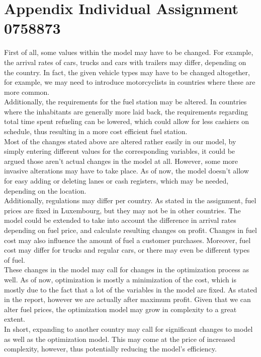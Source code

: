\section{Appendix Individual Assignment 0758873}\label{app:indivramon}
First of all, some values within the model may have to be changed.
For example, the arrival rates of cars, trucks and cars with trailers may differ, depending on the country.
In fact, the given vehicle types may have to be changed altogether, for example, we may need to introduce motorcyclists in countries where these are more common. \\
Additionally, the requirements for the fuel station may be altered.
In countries where the inhabitants are generally more laid back, the requirements regarding total time spent refueling can be lowered, which could allow for less cashiers on schedule, thus resulting in a more cost efficient fuel station. \\

Most of the changes stated above are altered rather easily in our model, by simply entering different values for the corresponding variables, it could be argued those aren't actual changes in the model at all.
However, some more invasive alterations may have to take place.
As of now, the model doesn't allow for easy adding or deleting lanes or cash registers, which may be needed, depending on the location. \\
Additionally, regulations may differ per country.
As stated in the assignment, fuel prices are fixed in Luxembourg, but they may not be in other countries.
The model could be extended to take into account the difference in arrival rates depending on fuel price, and calculate resulting changes on profit.
Changes in fuel cost may also influence the amount of fuel a customer purchases.
Moreover, fuel cost may differ for trucks and regular cars, or there may even be different types of fuel. \\

These changes in the model may call for changes in the optimization process as well.
As of now, optimization is mostly a minimization of the cost, which is mostly due to the fact that a lot of the variables in the model are fixed.
As stated in the report, however we are actually after maximum profit.
Given that we can alter fuel prices, the optimization model may grow in complexity to a great extent. \\
In short, expanding to another country may call for significant changes to model as well as the optimization model.
This may come at the price of increased complexity, however, thus potentially reducing the model's efficiency.